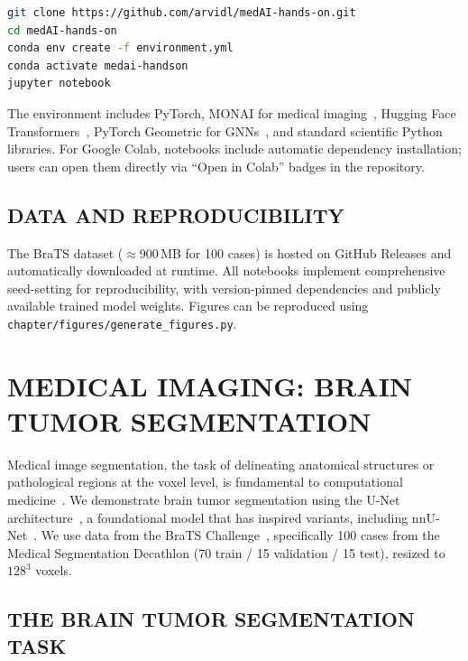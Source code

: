 \documentclass[krantz2,ChapterTOCs]{krantz}
\begin{document}
\begin{lstlisting}[language=bash,caption={Creating the conda environment}]
git clone https://github.com/arvidl/medAI-hands-on.git
cd medAI-hands-on
conda env create -f environment.yml
conda activate medai-handson
jupyter notebook
\end{lstlisting}

The environment includes PyTorch, MONAI for medical imaging~\citep{cardoso2022monai}, Hugging Face Transformers~\citep{wolf2020transformers}, PyTorch Geometric for GNNs~\citep{fey2019pyg}, and standard scientific Python libraries.
For Google Colab, notebooks include automatic dependency installation; users can open them directly via ``Open in Colab'' badges in the repository.

\subsection{DATA AND REPRODUCIBILITY}

The BraTS dataset ($\approx$900\,MB for 100 cases) is hosted on GitHub Releases and automatically downloaded at runtime.
All notebooks implement comprehensive seed-setting for reproducibility, with version-pinned dependencies and publicly available trained model weights.
Figures can be reproduced using \texttt{chapter/figures/generate\_figures.py}.

\section{MEDICAL IMAGING: BRAIN TUMOR SEGMENTATION}
\label{sec:imaging}

Medical image segmentation, the task of delineating anatomical structures or pathological regions at the voxel level, is fundamental to computational medicine~\citep{lundervold2019overview}. 
We demonstrate brain tumor segmentation using the U-Net architecture~\citep{ronneberger2015unet}, a foundational model that has inspired variants, including nnU-Net~\citep{isensee2021nnu}.
We use data from the BraTS Challenge~\citep{menze2015brats}, specifically 100 cases from the Medical Segmentation Decathlon (70 train / 15 validation / 15 test), resized to $128^3$ voxels.

\subsection{THE BRAIN TUMOR SEGMENTATION TASK}
\end{document}
